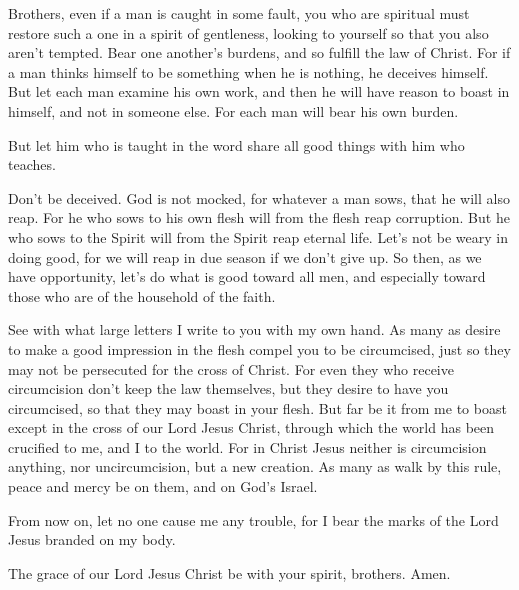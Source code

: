  Brothers, even if a man is caught in some fault, you who
are spiritual must restore such a one in a spirit of gentleness, looking
to yourself so that you also aren't tempted.  Bear one
another's burdens, and so fulfill the law of Christ.  For if
a man thinks himself to be something when he is nothing, he deceives
himself.  But let each man examine his own work, and then he
will have reason to boast in himself, and not in someone else.
 For each man will bear his own burden.

 But let him who is taught in the word share all good things
with him who teaches.

 Don't be deceived. God is not mocked, for whatever a man
sows, that he will also reap.  For he who sows to his own
flesh will from the flesh reap corruption. But he who sows to the Spirit
will from the Spirit reap eternal life.  Let's not be weary
in doing good, for we will reap in due season if we don't give up.
 So then, as we have opportunity, let's do what is good
toward all men, and especially toward those who are of the household of
the faith.

 See with what large letters I write to you with my own
hand.  As many as desire to make a good impression in the
flesh compel you to be circumcised, just so they may not be persecuted
for the cross of Christ.  For even they who receive
circumcision don't keep the law themselves, but they desire to have you
circumcised, so that they may boast in your flesh.  But far
be it from me to boast except in the cross of our Lord Jesus Christ,
through which the world has been crucified to me, and I to the world.
 For in Christ Jesus neither is circumcision anything, nor
uncircumcision, but a new creation.  As many as walk by
this rule, peace and mercy be on them, and on God's Israel.

 From now on, let no one cause me any trouble, for I bear
the marks of the Lord Jesus branded on my body.

 The grace of our Lord Jesus Christ be with your spirit,
brothers. Amen.
